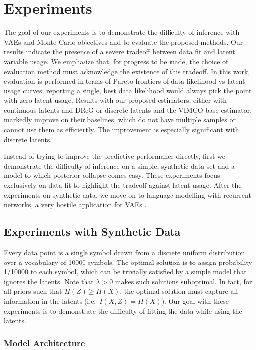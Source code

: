 \section{Experiments}
\label{sec:micmco-experiments}

The goal of our experiments is to demonstrate the difficulty of inference with VAEs and Monte Carlo objectives and to evaluate the proposed methods.
Our results indicate the presence of a severe tradeoff between data fit and latent variable usage.
We emphasize that, for progress to be made, the choice of evaluation method must acknowledge the existence of this tradeoff.
In this work, evaluation is performed in terms of Pareto frontiers of data likelihood vs latent usage curves; reporting a single, best data likelihood would always pick the point with zero latent usage.
Results with our proposed estimators, either with continuous latents and DReG or discrete latents and the VIMCO base estimator, markedly improve on their baselines, which do not have multiple samples or cannot use them as efficiently.
The improvement is especially significant with discrete latents.

Instead of trying to improve the predictive performance directly, first we demonstrate the difficulty of inference on a simple, synthetic data set and a model to which posterior collapse comes easy.
These experiments focus exclusively on data fit to highlight the tradeoff against latent usage.
After the experiments on synthetic data, we move on to language modelling with recurrent networks, a very hostile application for VAEs \citep{bowman2015generating}.

\subsection{Experiments with Synthetic Data}
\label{sec:micmco-experiments-with-synthetic-data}

Every data point is a single symbol drawn from a discrete uniform distribution over a vocabulary of 10000 symbols.
The optimal solution is to assign probability 1/10000 to each symbol, which can be trivially satisfied by a simple model that ignores the latents.
Note that $\lambda>0$ makes such solutions suboptimal.
In fact, for all priors such that $H(Z)\geqslant H(X)$, the optimal solution must capture all information in the latents (i.e.\ $I(X,Z)=H(X)$).
Our goal with these experiments is to demonstrate the difficulty of fitting the data while using the latents.

\subsubsection{Model Architecture}

